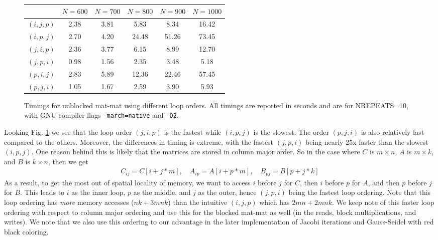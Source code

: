\documentclass[10pt]{article}
\begin{document}
\begin{enumerate}
\begin{figure}[!ht]
\begin{center}
\begin{tabular}{| c | c | c | c | c | c |}
\hline
& $N=600$ & $N=700$ & $N=800$ & $N=900$ & $N=1000$\\
\hline
$(i,j,p)$ & 2.38 & 3.81 & 5.83 & 8.34 & 16.42\\
$(i,p,j)$ & 2.70 & 4.20  & 24.48  & 51.26  & 73.45 \\
$(j,i,p)$ & 2.36 & 3.77 & 6.15 & 8.99 & 12.70 \\
$(j,p,i)$ & 0.98 & 1.56 & 2.35 & 3.48 & 5.18\\
$(p,i,j)$ & 2.83 & 5.89 & 12.36 & 22.46 & 57.45 \\
$(p,j,i)$ & 1.05 & 1.67 & 2.59 & 3.90 & 5.93\\
\hline
\end{tabular}
\caption{Timings for unblocked mat-mat using different loop orders. All timings are reported in seconds and are for NREPEATS=10, with GNU compiler flags \texttt{-march=native} and \texttt{-O2}.} \label{table:looporder}
\end{center}
\end{figure}

Looking Fig. \ref{table:looporder} we see that the loop order $(j,i,p)$ is the fastest while $(i,p,j)$ is the slowest. The order $(p,j,i)$ is also relatively fast compared to the others. Moreover, the differences in timing is extreme, with the fastest $(j,p,i)$ being nearly 25x faster than the slowest $(i,p,j)$. One reason behind this is likely that the matrices are stored in column major order. So in the case where $C$ is $m \times n$, $A$ is $m \times k$, and $B$ is $k \times n$, then we get
\begin{align*}
C_{ij} = C[i + j*m], \quad A_{ip} = A[i + p*m], \quad B_{pj} = B[p + j*k] 
\end{align*}
As a result, to get the most out of spatial locality of memory, we want to access $i$ before $j$ for $C$, then $i$ before $p$ for $A$, and then $p$ before $j$ for $B$. This leads to $i$ as the inner loop, $p$ as the middle, and $j$ as the outer, hence $(j,p,i)$ being the fastest loop ordering. Note that this loop ordering has \textit{more} memory accesses ($nk +3mnk$) than the intuitive $(i,j,p)$ which has $2mn + 2mnk$. We keep note of this faster loop ordering with respect to column major ordering and use this for the blocked mat-mat as well (in the reads, block multiplications, and writes). We note that we also use this ordering to our advantage in the later implementation of Jacobi iterations and Gauss-Seidel with red black coloring.


\end{enumerate}
\end{document}
